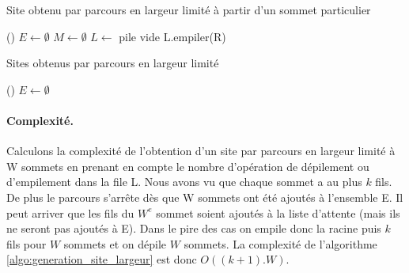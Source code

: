 \begin{algorithm}[h]
\DontPrintSemicolon
\caption{Site obtenu par parcours en largeur limité à partir d'un sommet particulier}
\SetAlgoLined
{}
\Fn(){}{
$E\leftarrow \emptyset$  
$M\leftarrow \emptyset$  
$L\leftarrow$ pile vide  
L.empiler(R)             \\
{
}
}
\label{algo:generation_site_largeur}
\end{algorithm}

\begin{algorithm}[h]
\DontPrintSemicolon
\caption{Sites obtenus par parcours en largeur limité}
\SetAlgoLined
{}
\Fn(){}{
$E\leftarrow\emptyset$\\
}
\label{algo:generation_sites_largeur}
\end{algorithm}

\paragraph{Complexité.}
Calculons la complexité de l'obtention d'un site par parcours en largeur limité à W sommets en prenant en compte le nombre d'opération de dépilement ou d'empilement dans la file L.
Nous avons vu que chaque sommet a au plus $k$ fils.
De plus le parcours s'arrête dès que W sommets ont été ajoutés à l'ensemble E. Il peut arriver que les fils du $W^e$ sommet soient ajoutés à la liste d'attente (mais ils ne seront pas ajoutés à E).
Dans le pire des cas on empile donc la racine puis $k$ fils pour $W$ sommets et on dépile $W$ sommets. La complexité de l'algorithme \ref{algo:generation_site_largeur} est donc $O((k+1).W)$.

